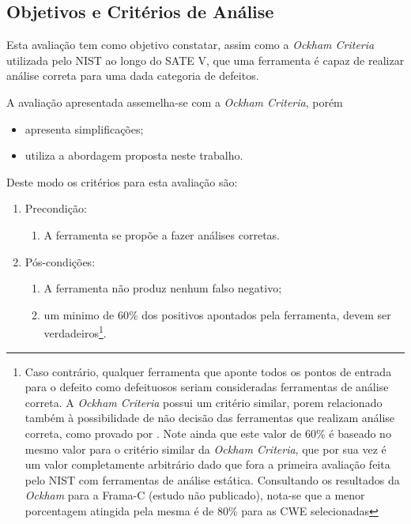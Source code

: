 \subsection{Objetivos e Critérios de Análise}

Esta avaliação tem como objetivo constatar, assim como a \textit{Ockham Criteria} utilizada pelo NIST ao longo do SATE V, que uma ferramenta é capaz de realizar análise correta para uma dada categoria de defeitos.

A avaliação apresentada assemelha-se com a \textit{Ockham Criteria}, porém
\begin{itemize}
  \item apresenta simplificações;
  \item utiliza a abordagem proposta neste trabalho.
\end{itemize}
Deste modo os critérios para esta avaliação são:

\begin{enumerate}
    \item Precondição:
\begin{enumerate}
  \item A ferramenta se propõe a fazer análises corretas.
\end{enumerate}

    \item Pós-condições:
\begin{enumerate}
  \item A ferramenta não produz nenhum falso negativo;
  \item um minimo de 60\% dos positivos apontados pela ferramenta, devem ser verdadeiros\footnote{Caso contrário, qualquer ferramenta que aponte todos os pontos de entrada para o defeito como defeituosos seriam consideradas ferramentas de análise correta. A \textit{Ockham Criteria} possui um critério similar, porem relacionado também à possibilidade de não decisão das ferramentas que realizam análise correta, como provado por \cite{rice}. Note ainda que este valor de 60\% é baseado no mesmo valor para o critério similar da \textit{Ockham Criteria}, que por sua vez é um valor completamente arbitrário dado que fora a primeira avaliação feita pelo NIST com ferramentas de análise estática. Consultando os resultados da \textit{Ockham} para a Frama-C (estudo não publicado), nota-se que a menor porcentagem atingida pela mesma é de 80\% para as CWE selecionadas}.
\end{enumerate}
\end{enumerate}
